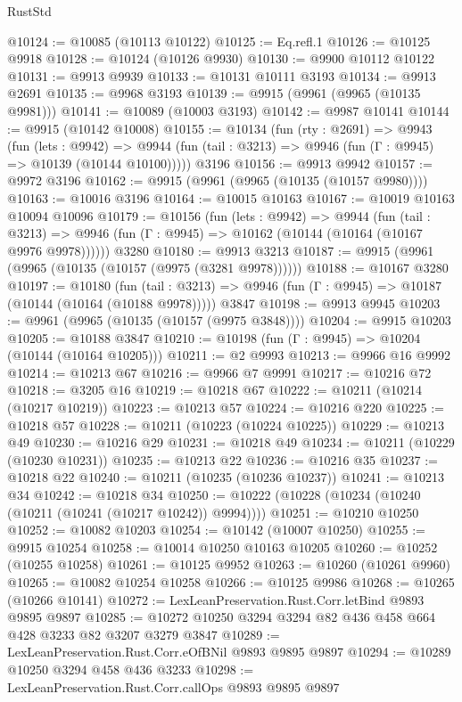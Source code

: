 \begin{lexlean}{RustStd}
\begin{coremodule}
@10124 := @10085 (@10113 @10122)
@10125 := Eq.refl.{1}
@10126 := @10125 @9918
@10128 := @10124 (@10126 @9930)
@10130 := @9900 @10112 @10122
@10131 := @9913 @9939
@10133 := @10131 @10111 @3193
@10134 := @9913 @2691
@10135 := @9968 @3193
@10139 := @9915 (@9961 (@9965 (@10135 @9981)))
@10141 := @10089 (@10003 @3193)
@10142 := @9987 @10141
@10144 := @9915 (@10142 @10008)
@10155 := @10134
    (fun (rty : @2691) =>
    @9943
      (fun (lets : @9942) =>
      @9944 (fun (tail : @3213) => @9946 (fun (Γ : @9945) => @10139 (@10144 @10100)))))
    @3196
@10156 := @9913 @9942
@10157 := @9972 @3196
@10162 := @9915 (@9961 (@9965 (@10135 (@10157 @9980))))
@10163 := @10016 @3196
@10164 := @10015 @10163
@10167 := @10019 @10163 @10094 @10096
@10179 := @10156
    (fun (lets : @9942) =>
    @9944
      (fun (tail : @3213) =>
      @9946 (fun (Γ : @9945) => @10162 (@10144 (@10164 (@10167 @9976 @9978))))))
    @3280
@10180 := @9913 @3213
@10187 := @9915 (@9961 (@9965 (@10135 (@10157 (@9975 (@3281 @9978))))))
@10188 := @10167 @3280
@10197 := @10180
    (fun (tail : @3213) => @9946 (fun (Γ : @9945) => @10187 (@10144 (@10164 (@10188 @9978)))))
    @3847
@10198 := @9913 @9945
@10203 := @9961 (@9965 (@10135 (@10157 (@9975 @3848))))
@10204 := @9915 @10203
@10205 := @10188 @3847
@10210 := @10198 (fun (Γ : @9945) => @10204 (@10144 (@10164 @10205)))
@10211 := @2 @9993
@10213 := @9966 @16 @9992
@10214 := @10213 @67
@10216 := @9966 @7 @9991
@10217 := @10216 @72
@10218 := @3205 @16
@10219 := @10218 @67
@10222 := @10211 (@10214 (@10217 @10219))
@10223 := @10213 @57
@10224 := @10216 @220
@10225 := @10218 @57
@10228 := @10211 (@10223 (@10224 @10225))
@10229 := @10213 @49
@10230 := @10216 @29
@10231 := @10218 @49
@10234 := @10211 (@10229 (@10230 @10231))
@10235 := @10213 @22
@10236 := @10216 @35
@10237 := @10218 @22
@10240 := @10211 (@10235 (@10236 @10237))
@10241 := @10213 @34
@10242 := @10218 @34
@10250 := @10222 (@10228 (@10234 (@10240 (@10211 (@10241 (@10217 @10242)) @9994))))
@10251 := @10210 @10250
@10252 := @10082 @10203
@10254 := @10142 (@10007 @10250)
@10255 := @9915 @10254
@10258 := @10014 @10250 @10163 @10205
@10260 := @10252 (@10255 @10258)
@10261 := @10125 @9952
@10263 := @10260 (@10261 @9960)
@10265 := @10082 @10254 @10258
@10266 := @10125 @9986
@10268 := @10265 (@10266 @10141)
@10272 := LexLeanPreservation.Rust.Corr.letBind @9893 @9895 @9897
@10285 := @10272 @10250 @3294 @3294 @82 @436 @458 @664 @428 @3233 @82 @3207 @3279 @3847
@10289 := LexLeanPreservation.Rust.Corr.eOfBNil @9893 @9895 @9897
@10294 := @10289 @10250 @3294 @458 @436 @3233
@10298 := LexLeanPreservation.Rust.Corr.callOps @9893 @9895 @9897

\end{coremodule}
\end{lexlean}
